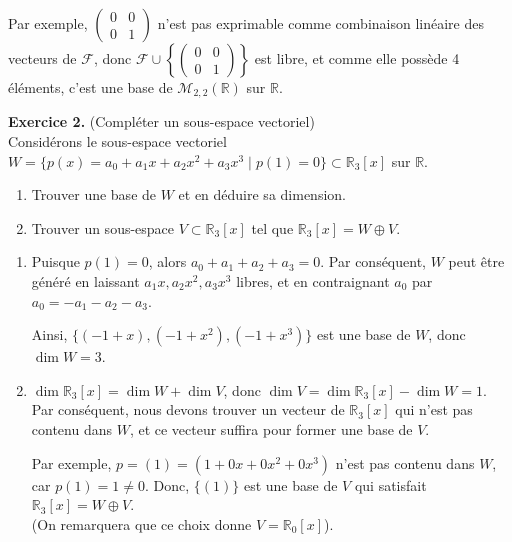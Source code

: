 \documentclass[a4paper, 10pt]{report}
\begin{document}
{\begin{minipage}{0.9\textwidth}
\begin{enumerate}[label=\arabic*.]
				Par exemple, $\left(\begin{smallmatrix}
						0&0\\0&1\end{smallmatrix}\right)$
				n'est pas exprimable comme combinaison linéaire des
				vecteurs de $\mathcal{F}$, donc $\mathcal{F} \cup
					\left\{\left(\begin{smallmatrix}0&0\\0&1
					\end{smallmatrix}\right)\right\}$
				est libre, et comme elle possède 4 éléments, c'est une
				base de $\mathcal{M}_{2,2}(\mathbb{R})$ sur $\mathbb{R}$.
			\end{enumerate}
		\end{minipage}
	}
	
	\vspace{5mm}
	\noindent
	\textbf{Exercice 2.} (Compléter un sous-espace vectoriel)\\
	Considérons le sous-espace vectoriel
	$W = \{p(x) = a_0 + a_1x + a_2x^2 + a_3x^3 \mid p(1) = 0\}
		\subset \mathbb{R}_3[x]$ sur $\mathbb{R}$.
	
	\begin{enumerate}[label=\arabic*.]
		\item Trouver une base de $W$ et en déduire sa dimension.
		\item Trouver un sous-espace $V \subset \mathbb{R}_3[x]$ tel que
		$\mathbb{R}_3[x] = W \oplus V$.
	\end{enumerate}
	
	\colorbox{solution}
	{
	\begin{minipage}{0.9\textwidth}
		\begin{enumerate}[label=\arabic*.]
			\item Puisque $p(1) = 0$, alors $a_0 + a_1 + a_2 + a_3 = 0$.
			Par conséquent, $W$ peut être généré en laissant
			$a_1x, a_2x^2, a_3x^3$ libres, et en contraignant $a_0$ par
			$a_0 = -a_1 - a_2 - a_3$.
			
			Ainsi, $\{(-1 + x), (-1 + x^2), (-1 + x^3)\}$ est une base
			de $W$, donc $\dim W = 3$.
			
			\vspace{12pt}
			\item $\dim \mathbb{R}_3[x] = \dim W + \dim V$, donc
			$\dim V = \dim \mathbb{R}_3[x] - \dim W = 1$. Par
			conséquent, nous devons trouver un vecteur de $\mathbb{R}_3[x]$
			qui n'est pas contenu dans $W$, et ce vecteur suffira pour
			former une base de $V$.\vspace{6pt}
			
			Par exemple, $p = (1) = (1 + 0x + 0x^2 + 0x^3)$ n'est pas
			contenu dans $W$, car $p(1) = 1 \neq 0$.
			Donc, $\{(1)\}$ est une base de $V$ qui satisfait
			$\mathbb{R}_3[x] = W \oplus V$.\\
			(On remarquera que ce choix donne $V = \mathbb{R}_0[x]$).
		\end{enumerate}
	\end{minipage}
	}
	
\end{document}
